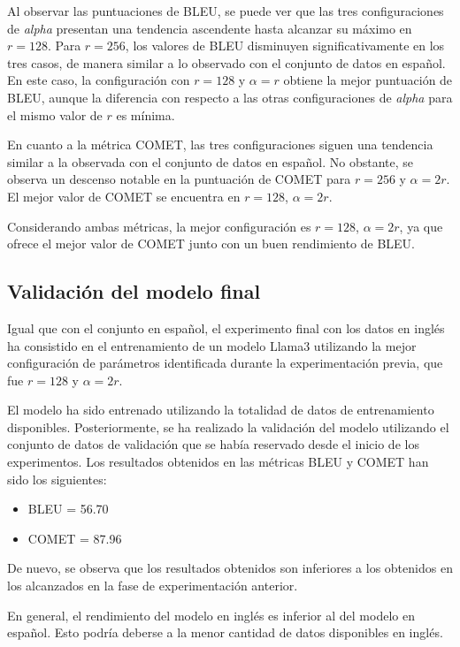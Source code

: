 \documentclass[11pt,spanish,listoffigures,listoftables]{tfgetsinf}
\begin{document}
Al observar las puntuaciones de BLEU, se puede ver que las tres configuraciones de \textit{alpha} presentan una tendencia ascendente hasta alcanzar su máximo en $r = 128$. Para $r = 256$, los valores de BLEU disminuyen significativamente en los tres casos, de manera similar a lo observado con el conjunto de datos en español. En este caso, la configuración con $r = 128$ y $\alpha = r$ obtiene la mejor puntuación de BLEU, aunque la diferencia con respecto a las otras configuraciones de \textit{alpha} para el mismo valor de $r$ es mínima.

En cuanto a la métrica COMET, las tres configuraciones siguen una tendencia similar a la observada con el conjunto de datos en español. No obstante, se observa un descenso notable en la puntuación de COMET para $r = 256$ y $\alpha = 2r$. El mejor valor de COMET se encuentra en $r = 128$, $\alpha = 2r$.

Considerando ambas métricas, la mejor configuración es $r = 128$, $\alpha = 2r$, ya que ofrece el mejor valor de COMET junto con un buen rendimiento de BLEU.

\subsection{Validación del modelo final}

Igual que con el conjunto en español, el experimento final con los datos en inglés ha consistido en el entrenamiento de un modelo Llama3 utilizando la mejor configuración de parámetros identificada durante la experimentación previa, que fue $r = 128$ y $\alpha = 2r$.

El modelo ha sido entrenado utilizando la totalidad de datos de entrenamiento disponibles. Posteriormente, se ha realizado la validación del modelo utilizando el conjunto de datos de validación que se había reservado desde el inicio de los experimentos. Los resultados obtenidos en las métricas BLEU y COMET han sido los siguientes:

\begin{itemize}
	\item BLEU = 56.70
	\item COMET = 87.96
\end{itemize}

De nuevo, se observa que los resultados obtenidos son inferiores a los obtenidos en los alcanzados en la fase de experimentación anterior.

En general, el rendimiento del modelo en inglés es inferior al del modelo en español. Esto podría deberse a la menor cantidad de datos disponibles en inglés.
\end{document}
